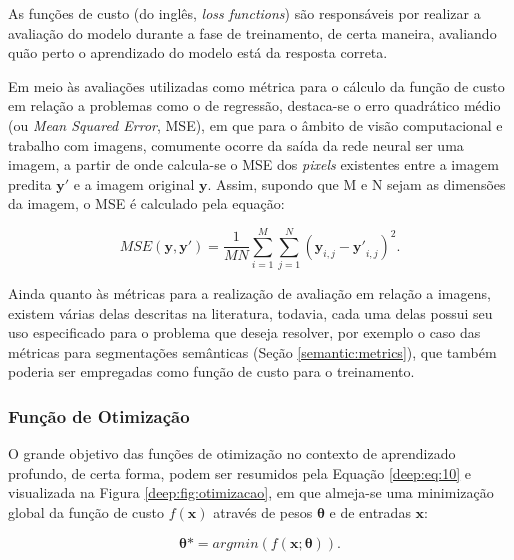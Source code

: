 As funções de custo (do inglês, \textit{loss functions}) são responsáveis por realizar a avaliação do modelo durante a fase de treinamento, de certa maneira, avaliando quão perto o aprendizado do modelo está da resposta correta.

Em meio às avaliações utilizadas como métrica para o cálculo da função de custo em relação a problemas como o de regressão, destaca-se o erro quadrático médio (ou \textit{Mean Squared Error}, MSE)\citep{Wang2004}, em que para o âmbito de visão computacional e trabalho com imagens, comumente ocorre da saída da rede neural ser uma imagem, a partir de onde calcula-se o MSE dos \textit{pixels} existentes entre a imagem predita $\boldsymbol{y'}$ e a imagem original $\boldsymbol{y}$. Assim, supondo que M e N sejam as dimensões da imagem, o MSE é calculado pela equação:

\begin{equation}
    \label{deep:eq:9}
    MSE(\boldsymbol{y}, \boldsymbol{y'}) = \frac{1}{MN} \sum_{i=1}^{M} \sum_{j=1}^{N} (\boldsymbol{y}_{i,j} - \boldsymbol{y'}_{i,j})^2.
\end{equation}

Ainda quanto às métricas para a realização de avaliação em relação a imagens, existem várias delas descritas na literatura, todavia,  cada uma delas possui seu uso especificado para o problema que deseja resolver, por exemplo o caso das métricas para segmentações semânticas (Seção \ref{semantic:metrics}), que também poderia ser empregadas como função de custo para o treinamento.


\subsubsection{Função de Otimização}
\label{deep:optimization}

O grande objetivo das funções de otimização no contexto de aprendizado profundo, de certa forma, podem ser resumidos pela Equação \ref{deep:eq:10} e visualizada na Figura \ref{deep:fig:otimizacao}, em que almeja-se uma minimização global da função de custo $f(\boldsymbol{x})$ através de pesos $\boldsymbol{\theta}$ e de entradas $\boldsymbol{x}$:

\begin{equation}
    \label{deep:eq:10}
    \boldsymbol{\theta}* = argmin(f(\boldsymbol{x};\boldsymbol{\theta})).
\end{equation}

